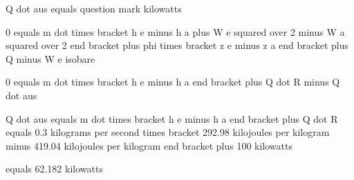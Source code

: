 Q dot aus equals question mark kilowatts

0 equals m dot times bracket h e minus h a plus W e squared over 2 minus W a squared over 2 end bracket plus phi times bracket z e minus z a end bracket plus Q minus W e isobare

0 equals m dot times bracket h e minus h a end bracket plus Q dot R minus Q dot aus

Q dot aus equals m dot times bracket h e minus h a end bracket plus Q dot R equals 0.3 kilograms per second times bracket 292.98 kilojoules per kilogram minus 419.04 kilojoules per kilogram end bracket plus 100 kilowatts

equals 62.182 kilowatts
